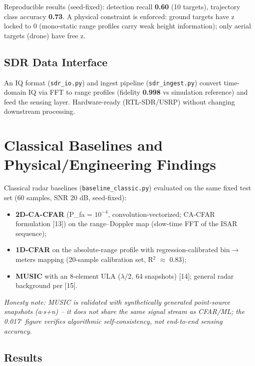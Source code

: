 \documentclass[11pt]{article}
\begin{document}
Reproducible results (seed-fixed): detection recall \textbf{0.60} (10 targets), trajectory class accuracy \textbf{0.73}. A physical constraint is enforced: ground targets have z locked to 0 (mono-static range profiles carry weak height information); only aerial targets (drone) have free z.

\subsection{SDR Data Interface}

An IQ format (\texttt{sdr\_io.py}) and ingest pipeline (\texttt{sdr\_ingest.py}) convert time-domain IQ via FFT to range profiles (fidelity \textbf{0.998} vs simulation reference) and feed the sensing layer. Hardware-ready (RTL-SDR/USRP) without changing downstream processing.


\section{Classical Baselines and Physical/Engineering Findings}

Classical radar baselines (\texttt{baseline\_classic.py}) evaluated on the same fixed test set (60 samples, SNR 20 dB, seed-fixed):

\begin{itemize}
\item \textbf{2D-CA-CFAR} (P\_fa = $10^{-4}$, convolution-vectorized; CA-CFAR formulation [13]) on the range--Doppler map (slow-time FFT of the ISAR sequence);
\item \textbf{1D-CFAR} on the absolute-range profile with regression-calibrated bin$\rightarrow$meters mapping (20-sample calibration set, R$^2$ $\approx$ 0.83);
\item \textbf{MUSIC} with an 8-element ULA ($\lambda$/2, 64 snapshots) [14]; general radar background per [15].
\end{itemize}

\textit{Honesty note: MUSIC is validated with synthetically generated point-source snapshots (a$\cdot$s+n) -- it does not share the same signal stream as CFAR/ML; the 0.017$^\circ$ figure verifies algorithmic self-consistency, not end-to-end sensing accuracy.}

\subsection{Results}
\end{document}
